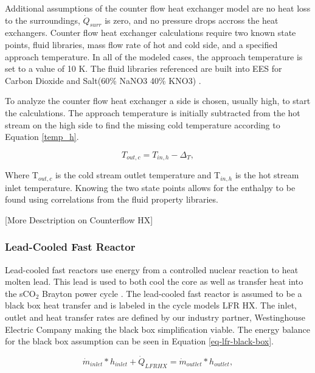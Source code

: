 \begin{paracol}{2}
\linenumbers
\switchcolumn

Additional assumptions of the counter flow heat exchanger model are no heat loss to the surroundings, $\dot{Q}_{surr}$ is zero, and no pressure drops accross the heat exchangers. Counter flow heat exchanger calculations require two known state points, fluid libraries, mass flow rate of hot and cold side, and a specified approach temperature. In all of the modeled cases, the approach temperature is set to a value of 10 K. The fluid libraries referenced are built into EES for Carbon Dioxide and Salt(60\% NaNO3 40\% KNO3) \cite{pacheco_1995_salt_properties,roland_1996_co2_properties}. 

To analyze the counter flow heat exchanger a side is chosen, usually high, to start the calculations. The approach temperature is initially subtracted from the hot stream on the high side to find the missing cold temperature according to Equation \ref{temp_h}. 

\begin{equation}
   \label{temp_h}
    T_{out,c} = T_{in,h}-\Delta_{T},
\end{equation}

Where T$_{out,c}$ is the cold stream outlet temperature and T$_{in,h}$ is the hot stream inlet temperature. Knowing the two state points allows for the enthalpy to be found using correlations from the fluid property libraries. 

[More Desctription on Counterflow HX]

\subsubsection{Lead-Cooled Fast Reactor}
Lead-cooled fast reactors use energy from a controlled nuclear reaction to heat molten lead. This lead is used to both cool the core as well as transfer heat into the sCO$_2$ Brayton power cycle \cite{smith_2016_lfr_background,alemberti_2013_lfr_overview}. The lead-cooled fast reactor is assumed to be a black box heat transfer and is labeled in the cycle models LFR HX. The inlet, outlet and heat transfer rates are defined by our industry partner, Westinghouse Electric Company making the black box simplification viable. The energy balance for the black box assumption can be seen in Equation \ref{eq-lfr-black-box}.

\begin{equation}
    \label{eq-lfr-black-box}
    \dot{m}_{inlet}*h_{inlet} + \dot{Q}_{LFRHX} = \dot{m}_{outlet}*h_{outlet},
\end{equation}


\end{paracol}
